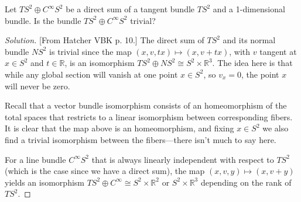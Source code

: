 \begin{manualexercise}{5.8}
	Let $TS^{2}\oplus C^{\infty} S^{2}$ be a direct sum of a tangent bundle $TS^{2}$ and a 1-dimensional bundle. Is the bundle $TS^{2}\oplus C^{\infty} S^{2}$ trivial?
\end{manualexercise}

\begin{proof}[Solution]
	[From Hatcher VBK p. 10.] The direct sum of $TS^{2}$ and its normal bundle $NS^{2}$ is trivial since the map $(x,v,tx)\mapsto (x,v+t x)$, with $v$ tangent at $x\in S^{2}$ and $t\in \mathbb{R}$, is an isomorphism $TS^{2}\oplus NS^{2}\cong S^{2}\times \mathbb{R}^{3}$. The idea here is that while any global section will vanish at one point $x\in S^{2}$, so $v_{x}=0$, the point $x$ will never be zero.

	Recall that a vector bundle isomorphism consists of an homeomorphism of the total spaces that restricts to a linear isomorphism between corresponding fibers. It is clear that the map above is an homeomorphism, and fixing $x \in S^{2}$ we also find a trivial isomorphism between the fibers---there isn't much to say here.

	For a line bundle $C^{\infty} S^{2}$ that is always linearly independent with respect to $TS^{2}$ (which is the case since we have a direct sum), the map $(x,v,y)\mapsto (x,v+y)$ yields an isomorphism $TS^{2}\oplus C^{\infty} \cong S^{2}\times \mathbb{R}^{2}$ or $S^{2}\times \mathbb{R}^{3}$ depending on the rank of $TS^{2}$.
\end{proof}


